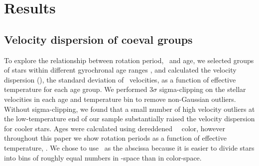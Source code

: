 \section{Results}
\label{sec:results}

\subsection{Velocity dispersion of coeval groups}
\label{sec:age_cut}

To explore the relationship between rotation period, \teff\ and age, we
selected groups of stars within different gyrochronal age ranges \citep[where
age was calculated using the][gyrochronology relation]{angus2019}, and
calculated the velocity dispersion (\sigmavb), the standard deviation of \vb\
velocities, as a function of effective temperature for each age group.
We performed 3$\sigma$ sigma-clipping on the stellar velocities in each age
and temperature bin to remove non-Gaussian outliers.
Without sigma-clipping, we found that a small number of high velocity
outliers at the low-temperature end of our sample substantially raised the
velocity dispersion for cooler stars.
Ages were calculated using dereddened \gaia\ \gcolor\ color, however
throughout this paper we show rotation periods as a function of effective
temperature, \teff.
We chose to use \teff\ as the abscissa because it is easier to divide stars
into bins of roughly equal numbers in \teff-space than in color-space.

